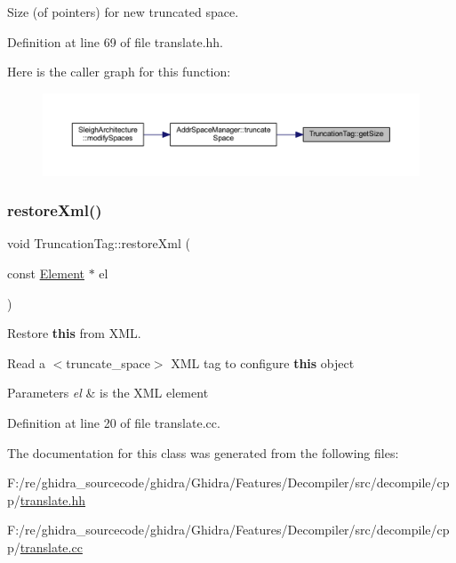 Size (of pointers) for new truncated space. 



Definition at line 69 of file translate.\+hh.

Here is the caller graph for this function\+:
\nopagebreak
\begin{figure}[H]
\begin{center}
\leavevmode
\includegraphics[width=350pt]{class_truncation_tag_a648828324c96d4844ac5f161e3c7e466_icgraph}
\end{center}
\end{figure}
\mbox{\label{class_truncation_tag_a3faaea2f7945daf530a209e66890ec0b}} 
\subsubsection{\texorpdfstring{restoreXml()}{restoreXml()}}
{\footnotesize\ttfamily void Truncation\+Tag\+::restore\+Xml (\begin{DoxyParamCaption}\item[{const \mbox{\hyperlink{class_element}{Element}} $\ast$}]{el }\end{DoxyParamCaption})}



Restore {\bfseries{this}} from X\+ML. 

Read a $<$truncate\+\_\+space$>$ X\+ML tag to configure {\bfseries{this}} object 
\begin{DoxyParams}{Parameters}
{\em el} & is the X\+ML element \\
\hline
\end{DoxyParams}


Definition at line 20 of file translate.\+cc.



The documentation for this class was generated from the following files\+:\begin{DoxyCompactItemize}
\item 
F\+:/re/ghidra\+\_\+sourcecode/ghidra/\+Ghidra/\+Features/\+Decompiler/src/decompile/cpp/\mbox{\hyperlink{translate_8hh}{translate.\+hh}}\item 
F\+:/re/ghidra\+\_\+sourcecode/ghidra/\+Ghidra/\+Features/\+Decompiler/src/decompile/cpp/\mbox{\hyperlink{translate_8cc}{translate.\+cc}}\end{DoxyCompactItemize}
